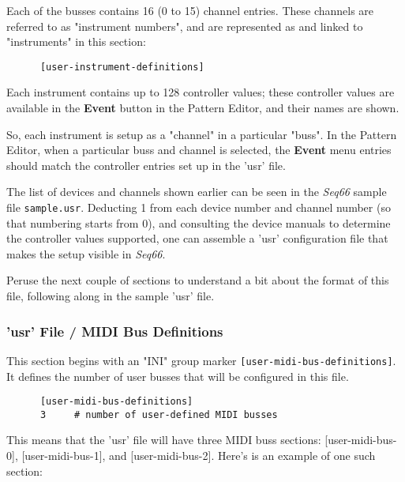    Each of the busses contains 16 (0 to 15) channel entries.
   These channels are referred to as "instrument numbers", and are
   represented as and linked to "instruments" in this section:

   \begin{verbatim}
      [user-instrument-definitions]
   \end{verbatim}

   Each instrument contains up
   to 128 controller values; these controller values are available in the
   \textbf{Event} button in the Pattern Editor, and their names are shown.

   So, each instrument is setup as a "channel" in a particular "buss".
   In the Pattern Editor, when a particular buss and channel is selected,
   the \textbf{Event} menu entries should match the controller entries set up
   in the 'usr' file.

   The list of devices and channels shown earlier
   can be seen in the \textsl{Seq66} sample file
   \texttt{sample.usr}.
   Deducting 1 from each device number and channel number (so that numbering
   starts from 0), and consulting the device manuals to determine the
   controller values supported, one can assemble a 'usr' configuration file
   that makes the setup visible in \textsl{Seq66}.

   Peruse the next couple of sections to understand a bit about the format of
   this file, following along in the sample 'usr' file.

\subsubsection{'usr' File / MIDI Bus Definitions}
\label{subsubsec:usr_file_midi_bus_definitions}

   This section begins with an
   "INI" group marker \texttt{[user-midi-bus-definitions]}.
   It defines the number of user busses that will be configured in this file.

   \begin{verbatim}
      [user-midi-bus-definitions]
      3     # number of user-defined MIDI busses
   \end{verbatim}

   This means that the 'usr' file will have three MIDI buss
   sections: [user-midi-bus-0], [user-midi-bus-1], and [user-midi-bus-2].
   Here's is an example of one such section:

